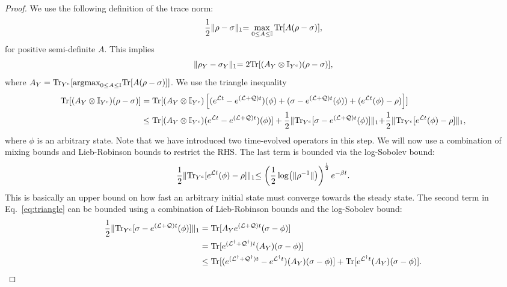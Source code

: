 \begin{proof}
 We use the following definition of the trace norm:
\begin{equation}
\frac{1}{2} \lVert \rho - \sigma \lVert_1 = \max_{0\leq A \leq \mathbb{I}} \text{Tr}[A (\rho-\sigma)],
\end{equation}
for positive semi-definite $A$. This implies
\begin{equation}
\lVert \rho_Y - \sigma_Y \lVert_1 = 2 \text{Tr}[ (A_Y \otimes \mathbb{I}_{Y^c}) (\rho - \sigma)],
\end{equation}
where $A_Y = \text{Tr}_{Y^c}[ \text{argmax}_{0\leq A \leq \mathbb{I}} \text{Tr}[A (\rho-\sigma)]]$.
We use the triangle inequality
\begin{align} \label{eq:triangle}
\text{Tr}[ (A_Y \otimes \mathbb{I}_{Y^c}) (\rho - \sigma)] &= \text{Tr}[ (A_Y \otimes \mathbb{I}_{Y^c}) \left[(e^{\mathcal{L} t } - e^{(\mathcal{L} +\mathcal{Q})t})(\phi) + (\sigma - e^{(\mathcal{L} +\mathcal{Q}) t}(\phi)) + (e^{\mathcal{L} t}(\phi) - \rho)\right]] \\
&\le \text{Tr}[ (A_Y \otimes \mathbb{I}_{Y^c}) (e^{\mathcal{L} t } - e^{(\mathcal{L} +\mathcal{Q})t}) (\phi)] + \frac{1}{2} \lVert \text{Tr}_{Y^c}[ \sigma - e^{(\mathcal{L} +\mathcal{Q}) t}(\phi) ] \lVert_1
+ \frac{1}{2} \lVert  \text{Tr}_{Y^c}[ e^{\mathcal{L} t}(\phi) - \rho ] \lVert_1,
\end{align}
where $\phi$ is an arbitrary state. Note that we have introduced two time-evolved operators in this step.
We will now use a combination of mixing bounds and Lieb-Robinson bounds to restrict the RHS.
The last term is bounded via the log-Sobolev bound:
\begin{equation}
 \frac{1}{2} \lVert  \text{Tr}_{Y^c}[ e^{\mathcal{L} t}(\phi) - \rho ] \lVert_1  \leq \left( \frac{1}{2} \log (\lVert \rho^{-1} \lVert )  \right)^{\frac12} e^{- \beta t}.
\end{equation}
This is basically an upper bound on how fast an arbitrary initial state must converge towards the steady state.
The second term in Eq.~\eqref{eq:triangle} can be bounded using a combination of Lieb-Robinson bounds and the log-Sobolev bound:
\begin{align}
\frac{1}{2} \lVert \text{Tr}_{Y^c}[ \sigma - e^{(\mathcal{L} +\mathcal{Q}) t}(\phi) ] \lVert_1  &=   \text{Tr}[ A_Y  e^{(\mathcal{L} +\mathcal{Q}) t} (  \sigma - \phi) ]   \\
&= \text{Tr}[ e^{(\mathcal{L}^\dagger +\mathcal{Q}^\dagger) t} (A_Y)   (  \sigma - \phi) ]  \\
&\leq \text{Tr}[ (e^{(\mathcal{L}^\dagger +\mathcal{Q}^\dagger) t } -  e^{\mathcal{L}^\dagger t }) (A_Y)   (  \sigma - \phi) ] +  \text{Tr}[  e^{\mathcal{L}^\dagger t } (A_Y)   (  \sigma - \phi) ].
\end{align}
%

\end{proof}
